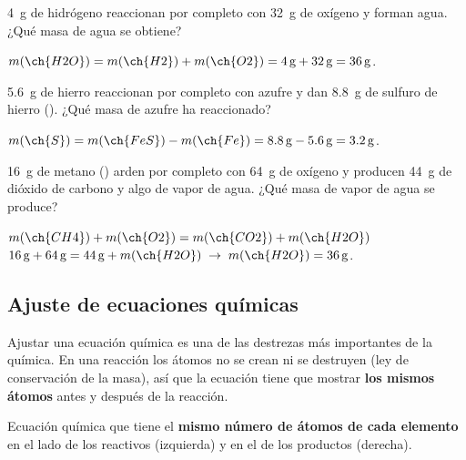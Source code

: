 \begin{exercise}
    \qty{4}{\g} de hidrógeno reaccionan por completo con \qty{32}{\g} de oxígeno y forman agua. ¿Qué masa de agua se obtiene?
    \begin{solu}
        \(m(\ch{H2O}) = m(\ch{H2}) + m(\ch{O2}) = \qty{4}{\g} + \qty{32}{\g} = \qty{36}{\g}\).
    \end{solu}
\end{exercise}

\begin{exercise}
    \qty{5.6}{\g} de hierro reaccionan por completo con azufre y dan \qty{8.8}{\g} de sulfuro de hierro (). ¿Qué masa de azufre ha reaccionado?
    \begin{solu}
        \(m(\ch{S}) = m(\ch{FeS}) - m(\ch{Fe}) = \qty{8.8}{\g} - \qty{5.6}{\g} = \qty{3.2}{\g}\).
    \end{solu}
\end{exercise}

\begin{exercise}
    \qty{16}{\g} de metano () arden por completo con \qty{64}{\g} de oxígeno y producen \qty{44}{\g} de dióxido de carbono y algo de vapor de agua. ¿Qué masa de vapor de agua se produce?
    \begin{solu}
        \(m(\ch{CH4}) + m(\ch{O2}) = m(\ch{CO2}) + m(\ch{H2O})\) \\
        \(\qty{16}{\g} + \qty{64}{\g} = \qty{44}{\g} + m(\ch{H2O}) \;\to\; m(\ch{H2O}) = \qty{36}{\g}\).
    \end{solu}
\end{exercise}

\subsection{Ajuste de ecuaciones químicas}

\providecommand{\balok}{\textcolor{green!50!black}{\(\checkmark\)}}
\providecommand{\balno}{\textcolor{red}{\(\boldsymbol{\times}\)}}

Ajustar una ecuación química es una de las destrezas más importantes de la química. En una reacción los átomos no se crean ni se destruyen (ley de conservación de la masa), así que la ecuación tiene que mostrar \textbf{los mismos átomos} antes y después de la reacción.

\begin{definition}
    Ecuación química que tiene el \textbf{mismo número de átomos de cada elemento} en el lado de los reactivos (izquierda) y en el de los productos (derecha).
\end{definition}

